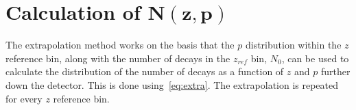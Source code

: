 
 
\FloatBarrier
  
\section[Calculation of $N(z,p)$]{Calculation of $\mathbold{N(z,p)}$}
\label{sec:extra}
The extrapolation method works on the basis that the $p$ distribution within the $z$ reference bin, along with the number of \KS decays in the $z_{ref}$ bin, $N_{0}$, can be used to calculate the distribution of the number of decays as a function of $z$ and $p$ further down the detector. This is done using~\autoref{eq:extra}. The extrapolation is  repeated for every $z$ reference bin.%


